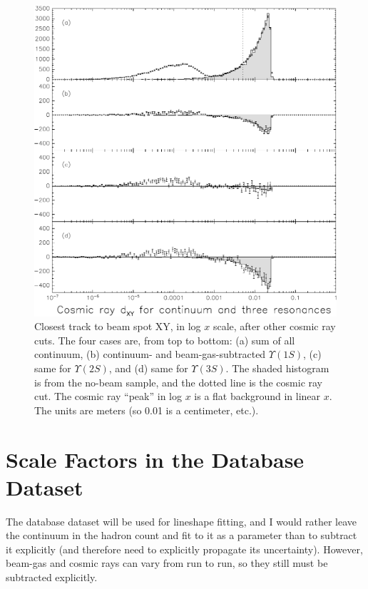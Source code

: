 \begin{figure}[p]
  \begin{center}
    \includegraphics[width=\linewidth]{plots/datasets_cosmic}
  \end{center}
  \caption{\label{datasets_cosmic} Closest track to beam spot XY, in
    log $x$ scale, after other cosmic ray cuts.  The four cases are,
    from top to bottom: (a) sum of all continuum, (b) continuum- and
    beam-gas-subtracted $\Upsilon(1S)$, (c) same for $\Upsilon(2S)$,
    and (d) same for $\Upsilon(3S)$.  The shaded histogram is from the
    no-beam sample, and the dotted line is the cosmic ray cut.  The
    cosmic ray ``peak'' in log $x$ is a flat background in linear $x$.
    The units are meters (so 0.01 is a centimeter, etc.).}
\end{figure}

\section{Scale Factors in the Database Dataset}

The database dataset will be used for lineshape fitting, and I would
rather leave the continuum in the hadron count and fit to it as a
parameter than to subtract it explicitly (and therefore need to
explicitly propagate its uncertainty).  However, beam-gas and cosmic
rays can vary from run to run, so they still must be subtracted
explicitly.

